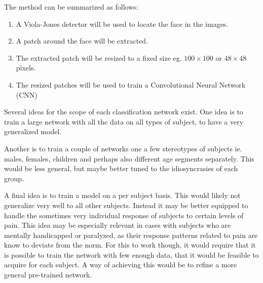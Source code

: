 \documentclass[Main]{subfiles}
\begin{document}
		The method can be summarized as follows:
		\begin{enumerate}
			\item 
			A Viola-Jones detector \cite{Viola2001} will be used to locate the face in the images.
			
			\item 
			A patch around the face will be extracted.

			\item
			The extracted patch will be resized to a fixed size eg. $100 \times 100$ or $48 \times 48$ pixels.

			\item
			The resized patches will be used to train a Convolutional Neural Network (CNN)

		\end{enumerate}

		Several ideas for the scope of each classification network exist.
		One idea is to train a large network with all the data on all types of subject, to have a very generalized model.

		Another is to train a couple of networks one a few stereotypes of subjects ie. males, females, children and perhaps also different age segments separately. This would be less general, but maybe better tuned to the idiosyncrasies of each group.

		A final idea is to train a model on a per subject basis.
		This would likely not generalize very well to all other subjects.
		Instead it may be better equipped to handle the sometimes very individual response of subjects to certain levels of pain.
		This idea may be especially relevant in cases with subjects who are mentally handicapped or paralyzed, as their response patterns related to pain are know to deviate from the norm.
		For this to work though, it would require that it is possible to train the network with few enough data, that it would be feasible to acquire for each subject.
		A way of achieving this would be to refine a more general pre-trained network.


	
\end{document}
